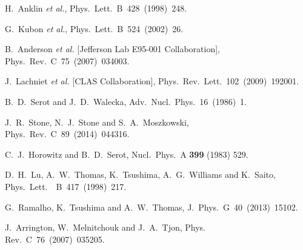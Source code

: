 \documentclass[preprint,aps,showpacs,floatfix]{revtex4}
\begin{document}
\begin{thebibliography}{99}
  H.~Anklin {\it et al.},
  Phys.~Lett.~B~428~(1998)~248. %
 


 G.~Kubon {\it et al.},
  Phys.~Lett.~B~524~(2002)~26.   %
  

  B.~Anderson {\it et al.} [Jefferson Lab E95-001 Collaboration],
  Phys.\ Rev.~C~75~(2007)~034003.    %

  J.~Lachniet {\it et al.}  [CLAS Collaboration],
  Phys.~Rev.~Lett.~102~(2009)~192001.  %
 


  
  B.~D.~Serot and J.~D.~Walecka,
  Adv.~Nucl.~Phys.~16~(1986)~1.
  
  
  J.~R.~Stone, N.~J.~Stone and S.~A.~Moszkowski,
  Phys.~Rev.~C~89~(2014)~044316.    %
  
  C.~J.~Horowitz and B.~D.~Serot,
  Nucl.\ Phys.\ A {\bf 399} (1983) 529.
  
  
  D.~H.~Lu, A.~W.~Thomas, K.~Tsushima, A.~G.~Williams and K.~Saito,
  Phys.~Lett.~\ B~417~(1998)~217. %
  
  G.~Ramalho, K.~Tsushima and A.~W.~Thomas,
  J.~Phys.~G~40~(2013)~15102.     %
  
  J.~Arrington, W.~Melnitchouk and J.~A.~Tjon,
  Phys.~ Rev.~C~76~(2007)~035205.   %


\end{thebibliography}
\end{document}
